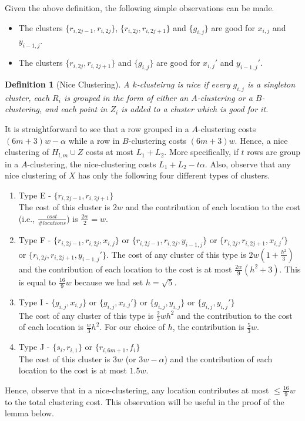 \documentclass[12pt]{article}
\newtheorem{definition}[theorem]{Definition}
\begin{document}
Given the above definition, the following simple observations can be made. 
\begin{itemize}[nolistsep,noitemsep]
\item The clusters $\{r_{i,2j-1}, r_{i, 2j}\}$, $\{r_{i,2j}, r_{i, 2j+1}\}$ and $\{g_{i,j}\}$ are good for $x_{i,j}$ and $y_{i-1,j}$.
\item The clusters $\{r_{i,2j}, r_{i, 2j+1}\}$ and $\{g_{i,j}\}$ are good for $x_{i,j}'$ and $y_{i-1,j}'$.
\end{itemize}

\begin{definition}[Nice Clustering]
\label{defn:niceClustering}
A $k$-clusteirng is nice if every $g_{i,j}$ is a singleton cluster, each $R_i$ is grouped in the form of either an $A$-clustering or a $B$-clustering, and each point in $Z_i$ is added to a cluster which is good for it.
\end{definition}

It is straightforward to see that a row grouped in a $A$-clustering costs $(6m+3)w-\alpha$ while a row in $B$-clustering costs $(6m+3)w$. Hence, a nice clustering of $H_{l,m} \cup Z$ costs at most $L_1 + L_2$. More specifically, if $t$ rows are group in a $A$-clustering, the nice-clustering costs $L_1+L_2-t\alpha$. Also, observe that any nice clustering of $X$ has only the following four different types of clusters. \begin{enumerate}[label=(\arabic*),nolistsep,leftmargin=*]
\item Type E - $\{r_{i,2j-1}, r_{i,2j+1}\}$ \\
The cost of this cluster is $2w$ and the contribution of each location to the cost (i.e., $\frac{cost}{\#locations}$) is $ \frac{2w}{2} = w$.
\item Type F - $\{r_{i,2j-1}, r_{i, 2j}, x_{i, j}\}$ or $\{r_{i,2j-1}, r_{i, 2j}, y_{i-1, j}\}$ or $\{r_{i,2j}, r_{i, 2j+1}, x_{i, j}'\}$ \\
or $\{r_{i,2j}, r_{i, 2j+1}, y_{i-1, j}'\}$. The cost of any cluster of this type is $2w(1+\frac{h^2}{3})$ and the contribution of each location to the cost is at most $\frac{2w}{9}(h^2+3)$. This is equal to $\frac{16}{9}w$ because we had set $h = \sqrt 5$.
\item Type I - $\{g_{i, j}, x_{i,j}\}$ or $\{g_{i, j}, x_{i,j}'\}$  or $\{g_{i, j}, y_{i,j}\}$  or $\{g_{i, j}, y_{i,j}'\}$\\
The cost of any cluster of this type is $\frac{2}{3}wh^2$ and the contribution to the cost of each location is $\frac{w}{3}h^2$. For our choice of $h$, the contribution is $\frac{5}{3}w$.
\item Type J - $\{s_i, r_{i,1}\}$ or $\{r_{i,6m+1}, f_i\}$\\
The cost of this cluster is $3w$ (or $3w-\alpha$) and the contribution of each location to the cost is at most $1.5w$. 
\end{enumerate}
Hence, observe that in a nice-clustering, any location contributes at most $\le \frac{16}{9}w$ to the total clustering cost. This observation will be useful in the proof of the lemma below.
\end{document}
